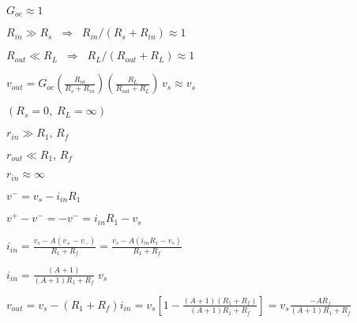 \documentclass{article}
\def\lthtmlcheckvsize{\ifdim\ht\sizebox<\vsize 
  \ifdim\wd\sizebox<\hsize\expandafter\hfill\fi \expandafter\vfill
  \else\expandafter\vss\fi}%
\begin{document}
{\newpage\clearpage
{}%
$ G_{oc} \approx 1$%
\lthtmlindisplaymathZ
\lthtmlcheckvsize\clearpage}

{\newpage\clearpage
{}%
$ R_{in}\gg R_s \;\;\Longrightarrow \;\;R_{in}/(R_s+R_{in})\approx 1$%
\lthtmlindisplaymathZ
\lthtmlcheckvsize\clearpage}

{\newpage\clearpage
{}%
$ R_{out}\ll R_L\;\;\Longrightarrow \;\;R_L/(R_{out}+R_L) \approx 1$%
\lthtmlindisplaymathZ
\lthtmlcheckvsize\clearpage}

{\newpage\clearpage
{}%
$\displaystyle v_{out}
=G_{oc} \left(\frac{R_{in}}{R_s+R_{in}}\right)\left(\frac{R_L}{R_{out}+R_L}\right)\,v_s
\approx v_s$%
\lthtmlindisplaymathZ
\lthtmlcheckvsize\clearpage}

{\newpage\clearpage
{}%
$ (R_s=0,\;R_L=\infty)$%
\lthtmlindisplaymathZ
\lthtmlcheckvsize\clearpage}

{\newpage\clearpage
{}%
$ r_{in}\gg R_1,\,R_f$%
\lthtmlindisplaymathZ
\lthtmlcheckvsize\clearpage}

{\newpage\clearpage
{}%
$ r_{out}\ll R_1,\,R_f$%
\lthtmlindisplaymathZ
\lthtmlcheckvsize\clearpage}

{\newpage\clearpage
{}%
$ r_{in}\approx \infty$%
\lthtmlindisplaymathZ
\lthtmlcheckvsize\clearpage}

{\newpage\clearpage
{}%
$ v^-=v_s-i_{in} R_1$%
\lthtmlindisplaymathZ
\lthtmlcheckvsize\clearpage}

{\newpage\clearpage
{}%
$ v^+-v^-=-v^-=i_{in} R_1 -v_s$%
\lthtmlindisplaymathZ
\lthtmlcheckvsize\clearpage}

{\newpage\clearpage
{}%
$\displaystyle i_{in}=\frac{v_s-A(v_+-v_-)}{R_1+R_f}=\frac{v_s-A(i_{in} R_1-v_s)}{R_1+R_f}$%
\lthtmlindisplaymathZ
\lthtmlcheckvsize\clearpage}

{\newpage\clearpage
{}%
$\displaystyle i_{in}=\frac{(A+1)}{(A+1)R_1+R_f}\;v_s$%
\lthtmlindisplaymathZ
\lthtmlcheckvsize\clearpage}

{\newpage\clearpage
{}%
$\displaystyle v_{out}=v_s-(R_1+R_f) i_{in}
=v_s\left[1-\frac{(A+1)(R_1+R_f)}{(A+1)R_1+R_f}\right]
=v_s\frac{-AR_f}{(A+1)R_1+R_f}$%
\lthtmlindisplaymathZ
\lthtmlcheckvsize\clearpage}
\end{document}
